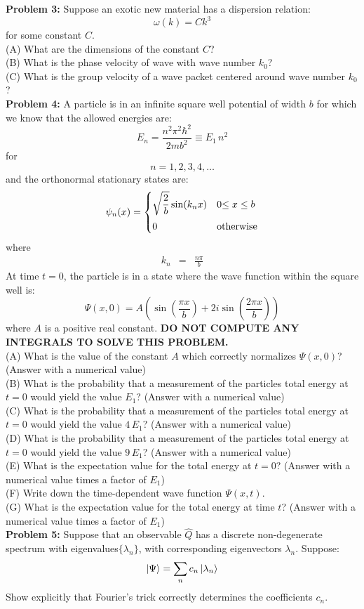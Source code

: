 \documentclass[12pt]{article}
\begin{document}
\noindent
{\bf Problem 3:} 
Suppose an exotic new material has a dispersion relation:
$$\omega(k) = C k^3$$
for some constant $C$.\\[5pt]
(A) What are the dimensions of the constant $C$?\\[5pt]
(B) What is the phase velocity of wave with wave number $k_0$?\\[5pt]
(C) What is the group velocity of a wave packet centered around wave number $k_0$?\\[5pt]


\noindent
{\bf Problem 4:}
A particle is in an infinite square well potential of width $b$ for which we know that the allowed energies are:
$$E_n = \frac{n^2 \pi^2 \hbar^2}{2mb^2} \equiv E_1 \, n^2$$
for
$$n=1,2,3,4,\ldots$$
and the orthonormal stationary states are:
$$
\psi_n(x) = 
\begin{cases}    
   {\displaystyle \sqrt{\frac{2}{b}}\sin(k_n x)} & 0 {\displaystyle \leq x \leq b} \\[8pt]
   0 & {\rm otherwise} \\
\end{cases}   
$$
where
\begin{eqnarray*}
k_n&=&\frac{n\pi}{b}
\end{eqnarray*}
At time $t=0$, the particle is in a state where the wave function within the square well is:
$$\Psi(x,0) = A\left( \sin\left(\frac{\pi x}{b}\right) + 2i \sin\left(\frac{2 \pi x}{b}\right) \right)$$
where $A$ is a positive real constant.  {\bf DO NOT COMPUTE ANY INTEGRALS TO SOLVE THIS PROBLEM.}\\[5pt]

\noindent
(A) What is the value of the constant $A$ which correctly normalizes $\Psi(x,0)$? (Answer with a numerical value)\\[8pt]
(B) What is the probability that a measurement of the particles total energy at $t=0$ would yield the value $E_1$? (Answer with a numerical value)\\[8pt]
(C) What is the probability that a measurement of the particles total energy at $t=0$ would yield the value $4\,E_1$? (Answer with a numerical value)\\[8pt]
(D) What is the probability that a measurement of the particles total energy at $t=0$ would yield the value $9\,E_1$? (Answer with a numerical value)\\[8pt]
(E) What is the expectation value for the total energy at $t=0$?  (Answer with a numerical value times a factor of $E_1$)\\[8pt]
(F) Write down the time-dependent wave function $\Psi(x,t)$.\\[8pt]
(G) What is the expectation value for the total energy at time $t$?  (Answer with a numerical value times a factor of $E_1$)\\[8pt]


\noindent
{\bf Problem 5:}  Suppose that an observable $\hat{Q}$ has a discrete non-degenerate spectrum with eigenvalues$\{\lambda_n\}$, with corresponding eigenvectors $\lambda_{n}$.  Suppose:
$$\ket{\Psi} = \sum_n c_n \ket{\lambda_n}$$
Show explicitly that Fourier's trick correctly determines the coefficients $c_n$.
\end{document}
